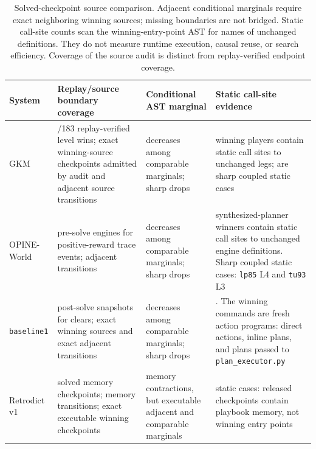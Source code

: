 \documentclass[11pt]{article}
\theoremstyle{definition}
\theoremstyle{remark}
\begin{document}
\begin{table}[H]
\centering
\scriptsize
\begin{tabularx}{\textwidth}{@{}l>{\raggedright\arraybackslash}p{}
  >{\raggedright\arraybackslash}p{}
  >{\raggedright\arraybackslash}X@{}}
\toprule
System & Replay/source boundary coverage & Conditional AST marginal &
Static call-site evidence \\
\midrule
GKM & 181/183 replay-verified level wins; \GKMExactWins{} exact winning-source
checkpoints admitted by audit and \GKMExactAdjacent{} adjacent source transitions &
\GKMDecreases{} decreases among \GKMComparable{} comparable marginals;
\GKMSharpDrops{} sharp drops &
\GKMHardReuse{} winning players contain static call sites to unchanged legs;
\GKMCoupledWitnesses{} are sharp coupled static cases \\
OPINE-World & \OPINEExactWins{} pre-solve engines for
\OPINETraceSolveEvents{} positive-reward trace
events; \OPINEExactAdjacent{} adjacent transitions &
\OPINEDecreases{} decreases among \OPINEComparable{} comparable marginals;
\OPINESharpDrops{} sharp drops &
\OPINEHardReuse{} synthesized-planner winners contain static call sites to unchanged engine definitions.
Sharp coupled static cases: \texttt{lp85} L4 and \texttt{tu93} L3 \\
\texttt{baseline1} & \BaselineOneRetainedCheckpoints{} post-solve snapshots for
\BaselineOneReportedClears{} clears; \BaselineOneExactWins{} exact winning sources and
\BaselineOneExactAdjacent{} exact adjacent transitions &
\BaselineOneDecreases{} decreases among \BaselineOneComparable{} comparable
marginals; \BaselineOneSharpDrops{} sharp drops &
\BaselineOneHardReuse{}. The \BaselineOneExactAdjacent{} winning commands are fresh
action programs: \BaselineOneDirectLiteralWins{} direct actions,
\BaselineOneInlineLiteralWins{} inline plans, and
\BaselineOneExecutorLiteralWins{} plans passed to \texttt{plan\_executor.py} \\
Retrodict v1 & \RetrodictRetainedCheckpoints{} solved memory checkpoints;
\RetrodictMemoryTransitions{} memory transitions; \RetrodictExactWins{} exact
executable winning checkpoints &
\RetrodictMemoryContractions{} memory contractions, but
\RetrodictExactAdjacent{} executable adjacent and \RetrodictComparable{} comparable
marginals &
\RetrodictHardReuse{} static cases: released checkpoints contain playbook
memory, not winning entry points \\
\bottomrule
\end{tabularx}
\caption{Solved-checkpoint source comparison. Adjacent conditional marginals require
exact neighboring winning sources; missing boundaries are not bridged. Static call-site
counts scan the winning-entry-point AST for names of unchanged definitions. They do
not measure runtime execution, causal reuse, or search efficiency. Coverage of the
source audit is distinct from replay-verified endpoint coverage.}
\label{tab:audit-axes}
\end{table}
\end{document}
